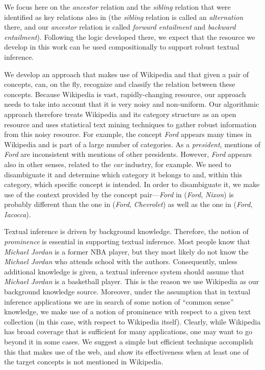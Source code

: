We focus here on the {\em ancestor} relation and the {\em
sibling} relation that were identified as key relations also
in \cite{maccartney-manning:2008:PAPERS} (the {\em sibling}
relation is called an {\em alternation} there, and our {\em
ancestor} relation is called {\em forward entailment} and {\em
backward entailment}). Following the logic developed there, we
expect that the resource we develop in this work can be used
compositionally to support robust textual inference.


We develop an approach that makes use of Wikipedia and that given a
pair of concepts, can, on the fly, recognize and classify the relation
between these concepts. Because Wikipedia is vast, rapidly-changing
resource, our approach needs to take into account that it is very
noisy and non-uniform. Our algorithmic approach therefore treats
Wikipedia and its category structure as an open resource and uses
statistical text mining techniques to gather robust information from
this noisy resource. For example, the concept {\em Ford} appears many
times in Wikipedia and is part of a large number of categories. As a
{\em president}, mentions of {\em Ford} are inconsistent with
mentions of other presidents. However, {\em Ford} appears also in other
senses, related to the {\em car} industry, for example.  We need to
disambiguate it and determine which category it belongs to and, within
this category, which specific concept is intended.
%
In order to disambiguate it, we make use of the context provided by
the concept pair---{\em Ford} in ({\em Ford}, {\em Nixon}) is probably
different than the one in ({\em Ford}, {\em Chevrolet}) as well as the
one in ({\em Ford}, {\em Iacocca}).

Textual inference is driven by background knowledge. Therefore, the
notion of {\em prominence} is essential in supporting textual
inference. Most people know that {\em Michael Jordan} is a former NBA
player, but they most likely do not know the {\em Michael Jordan} who
attends school with the authors.  Consequently, unless additional
knowledge is given, a textual inference system should assume that {\em
  Michael Jordan} is a basketball player. This is the reason we use
Wikipedia as our background knowledge source. Moreover, under the
assumption that in textual inference applications we are in search of
some notion of ``common sense'' knowledge, we make use of a notion of
prominence with respect to a given text collection (in this case, with
respect to Wikipedia itself). Clearly, while Wikipedia has broad
coverage that is sufficient for many applications, one may want to go
beyond it in some cases. We suggest a simple but efficient technique
accomplish this that makes use of the web, and show its effectiveness
when at least one of the target concepts is not mentioned in
Wikipedia.

